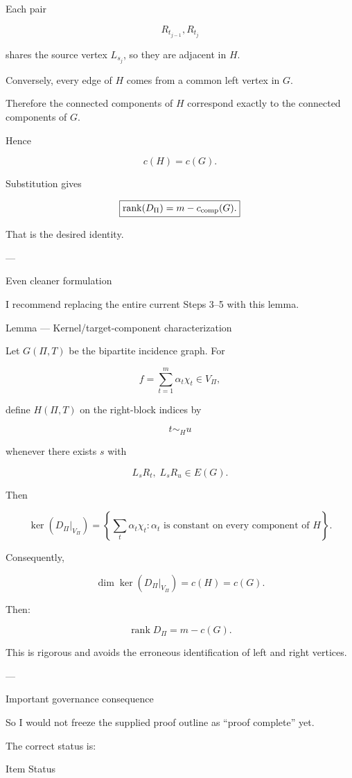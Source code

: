 Each pair

\[
R_{t_{j-1}},R_{t_j}  
\]

shares the source vertex \(L_{s_j}\), so they are adjacent in \(H\).

Conversely, every edge of \(H\) comes from a common left vertex in \(G\).

Therefore the connected components of \(H\) correspond exactly to the connected components of \(G\).

Hence

\[
c(H)=c(G).  
\]

Substitution gives

\[
\boxed{  
\operatorname{rank}(D_\Pi)  
=  
m-c_{\rm comp}(G).  
}  
\]

That is the desired identity.


---

Even cleaner formulation

I recommend replacing the entire current Steps 3–5 with this lemma.

Lemma — Kernel/target-component characterization

Let \(G(\Pi,T)\) be the bipartite incidence graph. For

\[
f=\sum_{t=1}^m\alpha_t\chi_t\in V_\Pi,  
\]

define \(H(\Pi,T)\) on the right-block indices by

\[
t\sim_H u  
\]

whenever there exists \(s\) with

\[
L_sR_t,\;L_sR_u\in E(G).  
\]

Then

\[
\boxed{  
\ker(D_\Pi|_{V_\Pi})  
=  
\left\{  
\sum_t\alpha_t\chi_t:  
\alpha_t\text{ is constant on every component of }H  
\right\}.  
}  
\]

Consequently,

\[
\dim\ker(D_\Pi|_{V_\Pi})=c(H)=c(G).  
\]

Then:

\[
\boxed{  
\operatorname{rank}D_\Pi  
=m-c(G).  
}  
\]

This is rigorous and avoids the erroneous identification of left and right vertices.


---

Important governance consequence

So I would not freeze the supplied proof outline as “proof complete” yet.

The correct status is:

Item	Status

